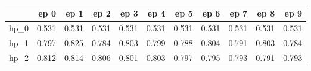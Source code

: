 \begin{tabular}{lrrrrrrrrrr}
\toprule
{} &   ep 0 &   ep 1 &   ep 2 &   ep 3 &   ep 4 &   ep 5 &   ep 6 &   ep 7 &   ep 8 &   ep 9 \\
\midrule
hp\_0 &  0.531 &  0.531 &  0.531 &  0.531 &  0.531 &  0.531 &  0.531 &  0.531 &  0.531 &  0.531 \\
hp\_1 &  0.797 &  0.825 &  0.784 &  0.803 &  0.799 &  0.788 &  0.804 &  0.791 &  0.803 &  0.784 \\
hp\_2 &  0.812 &  0.814 &  0.806 &  0.801 &  0.803 &  0.797 &  0.795 &  0.793 &  0.791 &  0.793 \\
\bottomrule
\end{tabular}
